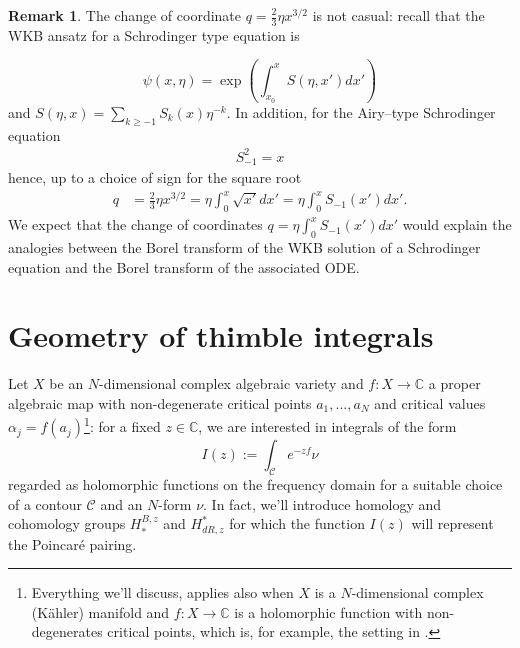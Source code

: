 \documentclass{article}
\theoremstyle{definition}
\newcommand{\C}{\mathbb{C}}
\newtheorem{remark}[definition]{Remark}
\begin{document}
\begin{remark}
The change of coordinate $q=\frac{2}{3}\eta x^{3/2}$ is not casual: recall that the WKB ansatz for a Schrodinger type equation is

\begin{equation}
\psi(x,\eta)=\exp\left(\int_{x_0}^xS(\eta,x')dx'\right)
\end{equation} 
 and $S(\eta,x)=\sum_{k\geq -1}S_k(x)\eta^{-k}$. In addition, for the Airy--type Schrodinger equation 
 \begin{align*}
 S_{-1}^2=x
 \end{align*}
hence, up to a choice of sign for the square root
\begin{align*}
q&=\frac{2}{3}\eta x^{3/2}=\eta\int_0^x\sqrt{x'}dx'=\eta\int_{0}^xS_{-1}(x')dx'.
\end{align*}
We expect that the change of coordinates $q=\eta\int_0^{x}S_{-1}(x')dx'$ would explain the analogies between the Borel transform of the WKB solution of a Schrodinger equation and the Borel transform of the associated ODE.  
\end{remark} 

\section{Geometry of thimble integrals}

Let $X$ be an $N$-dimensional complex algebraic variety and $f\colon X\to\C$ a proper algebraic map with non-degenerate critical points $a_1,...,a_N$ and critical values $\alpha_j=f(a_j)$\footnote{Everything we’ll discuss, applies also when $X$ is a $N$-dimensional complex (K\"ahler) manifold and $f\colon X\to\C$ is a holomorphic function with non-degenerates critical points, which is, for example, the setting in \cite{Witten}.}: for a fixed $z\in\C$, we are interested in integrals of the form 
\[
I(z):=\int_{\mathcal{C}}e^{-zf}\nu
\]
regarded as holomorphic functions on the frequency domain for a suitable choice of a contour $\mathcal{C}$ and an $N$-form $\nu$. In fact, we'll introduce homology and cohomology groups $H_{*}^{B,z}$ and $H_{dR,z}^*$ for which the function $I(z)$ will represent the Poincar\'e pairing. 
\end{document}
